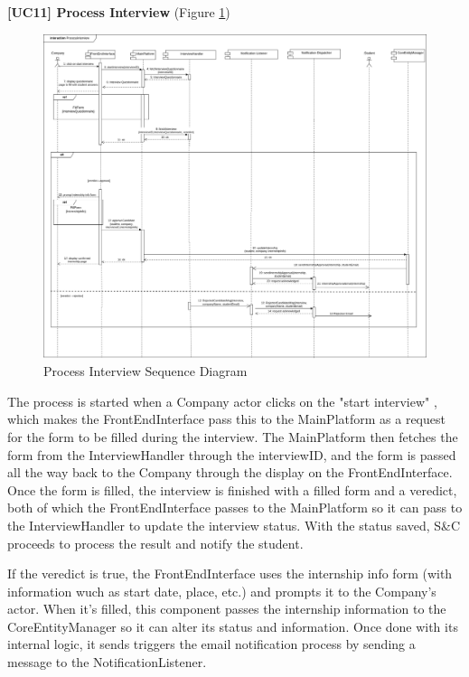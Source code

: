 \textbf{[UC11] Process Interview}
(Figure \ref{fig:processinterviewsequence})
\begin{figure}[H]
\centering
\includegraphics[width=\textwidth]{Images/interview_process-sequence.png}
\caption{\label{fig:processinterviewsequence} Process Interview Sequence Diagram}
\end{figure}

The process is started when a Company actor clicks on the "start interview" , which makes the FrontEndInterface pass this to the MainPlatform as a request for the form to be filled during the interview. The MainPlatform then fetches the form from the InterviewHandler through the interviewID, and the form is passed all the way back to the Company through the display on the FrontEndInterface. Once the form is filled, the interview is finished with a filled form and a veredict, both of which the FrontEndInterface passes to the MainPlatform so it can pass to the InterviewHandler to update the interview status. With the status saved, S\&C proceeds to process the result and notify the student.

If the veredict is true, the FrontEndInterface uses the internship info form (with information wuch as start date, place, etc.) and prompts it to the Company's actor. When it's filled, this component passes the internship information to the CoreEntityManager so it can alter its status and information. Once done with its internal logic, it sends triggers the email notification process by sending a message to the NotificationListener.

